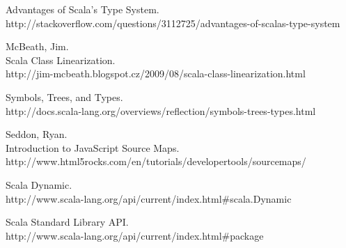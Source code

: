 \begin{thebibliography}{99}
	Advantages of Scala's Type System.\\
	http://stackoverflow.com/questions/3112725/advantages-of-scalas-type-system
	
  {\sc McBeath}, Jim.\\
	Scala Class Linearization.\\
	http://jim-mcbeath.blogspot.cz/2009/08/scala-class-linearization.html
	
	Symbols, Trees, and Types.\\
	http://docs.scala-lang.org/overviews/reflection/symbols-trees-types.html
	
  {\sc Seddon,} Ryan.\\
	Introduction to JavaScript Source Maps.\\
  http://www.html5rocks.com/en/tutorials/developertools/sourcemaps/
	
  Scala Dynamic.\\
	http://www.scala-lang.org/api/current/index.html\#scala.Dynamic
	
	Scala Standard Library API.\\
  http://www.scala-lang.org/api/current/index.html\#package
		
\end{thebibliography}
